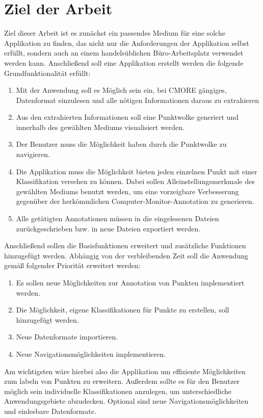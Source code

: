 \section{Ziel der Arbeit}
Ziel dieser Arbeit ist es zunächst ein passendes Medium für eine solche Applikation zu finden, das nicht nur die Anforderungen der Applikation selbst erfüllt, sondern auch an einem handelsüblichen Büro-Arbeitsplatz verwendet werden kann. Anschließend soll eine Applikation erstellt werden die folgende Grundfunktionalität erfüllt:\\

\begin{enumerate}
\item Mit der Anwendung soll es Möglich sein ein, bei CMORE gängiges, Datenformat einzulesen und alle nötigen Informationen daraus zu extrahieren

\item Aus den extrahierten Informationen soll eine Punktwolke generiert und innerhalb des gewählten Mediums visualisiert werden.

\item Der Benutzer muss die Möglichkeit haben durch die Punktwolke zu navigieren.

\item Die Applikation muss die Möglichkeit bieten jeden einzelnen Punkt mit einer Klassifikation versehen zu können. Dabei sollen Alleinstellungsmerkmale des gewählten Mediums benutzt werden, um eine vorzeigbare Verbesserung gegenüber der herkömmlichen Computer-Monitor-Annotation zu generieren. 

\item Alle getätigten Annotationen müssen in die eingelesenen Dateien zurückgeschrieben bzw. in neue Dateien exportiert werden.
\end{enumerate}

Anschließend sollen die Basisfunktionen erweitert und zusätzliche Funktionen hinzugefügt werden. Abhängig von der verbleibenden Zeit soll die Anwendung gemäß folgender Priorität erweitert werden:\\

\begin{enumerate}
\item Es sollen neue Möglichkeiten zur Annotation von Punkten implementiert werden.

\item Die Möglichkeit, eigene Klassifikationen für Punkte zu erstellen, soll hinzugefügt werden.

\item Neue Datenformate importieren.

\item Neue Navigationsmöglichkeiten implementieren.
\end{enumerate}

Am wichtigsten wäre hierbei also die Applikation um effiziente Möglichkeiten zum labeln von Punkten zu erweitern. Außerdem sollte es für den Benutzer möglich sein individuelle Klassifikationen anzulegen, um unterschiedliche Anwendungsgebiete abzudecken. Optional sind neue Navigationsmöglichkeiten und einlesbare Datenformate.